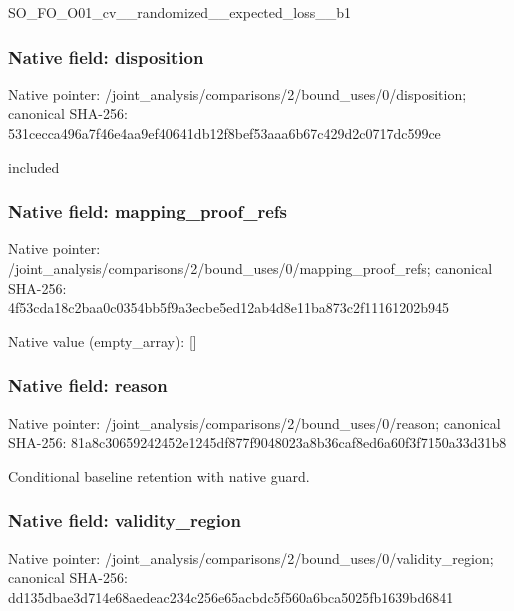 \documentclass[10pt,a4paper]{article}
\begin{document}
\begingroup\raggedright\sloppy SO\_\allowbreak{}FO\_\allowbreak{}O01\_\allowbreak{}cv\_\allowbreak{}\_\allowbreak{}randomized\_\allowbreak{}\_\allowbreak{}expected\_\allowbreak{}loss\_\allowbreak{}\_\allowbreak{}b1\par\endgroup

\subsubsection{Native field: disposition}
Native pointer: /joint\_\allowbreak{}analysis/comparisons/2/bound\_\allowbreak{}uses/0/disposition; canonical SHA-256: 531cecca496a7f46e4aa9ef40641db12f8bef53aaa6b67c429d2c0717dc599ce

\begingroup\raggedright\sloppy included\par\endgroup

\subsubsection{Native field: mapping\_\allowbreak{}proof\_\allowbreak{}refs}
Native pointer: /joint\_\allowbreak{}analysis/comparisons/2/bound\_\allowbreak{}uses/0/mapping\_\allowbreak{}proof\_\allowbreak{}refs; canonical SHA-256: 4f53cda18c2baa0c0354bb5f9a3ecbe5ed12ab4d8e11ba873c2f11161202b945

Native value (empty\_\allowbreak{}array): []

\subsubsection{Native field: reason}
Native pointer: /joint\_\allowbreak{}analysis/comparisons/2/bound\_\allowbreak{}uses/0/reason; canonical SHA-256: 81a8c30659242452e1245df877f9048023a8b36caf8ed6a60f3f7150a33d31b8

\begingroup\raggedright\sloppy Conditional baseline retention with native guard.\par\endgroup

\subsubsection{Native field: validity\_\allowbreak{}region}
Native pointer: /joint\_\allowbreak{}analysis/comparisons/2/bound\_\allowbreak{}uses/0/validity\_\allowbreak{}region; canonical SHA-256: dd135dbae3d714e68aedeac234c256e65acbdc5f560a6bca5025fb1639bd6841
\end{document}
